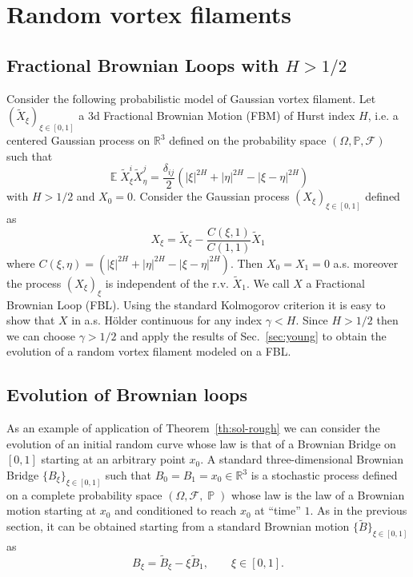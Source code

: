 \documentclass[a4paper,12pt,reqno]{amsart}
\DeclareMathOperator{\expect}{{\mathbb E}}
\DeclareMathOperator{\prob}{{\mathbb P}}
\begin{document}

\section{Random vortex filaments}
\label{sec:random}

\subsection{Fractional Brownian Loops with $H > 1/2$}
\label{sec:fbl}

Consider the following probabilistic model of Gaussian vortex
filament. Let $(\tilde X_\xi)_{\xi \in [0,1]}$ a 3d Fractional
Brownian Motion (FBM) of Hurst index $H$, i.e. a centered Gaussian process on
$\mathbb{R}^3$ defined on the probability space
$(\Omega,\mathbb{P},\mathcal{F})$ such that 
$$
 \expect \tilde X^i_\xi \tilde X^j_\eta 
= \frac{\delta_{ij}}{2}  (|\xi|^{2H}+|\eta|^{2H}-|\xi-\eta|^{2H})
$$
with $H > 1/2$ and $X_0 = 0$. Consider the Gaussian process $(X_\xi)_{\xi\in[0,1]}$
defined as 
$$
X_\xi = \tilde X_\xi - \frac{C(\xi,1)}{C(1,1)} \tilde X_1
$$
where $C(\xi,\eta) = (|\xi|^{2H}+|\eta|^{2H}-|\xi-\eta|^{2H})$.
Then $X_0 = X_1 = 0$ a.s. moreover the process $(X_\xi)_\xi$ is independent of
the r.v. $\tilde X_1$. We call $X$ a Fractional Brownian Loop (FBL).
Using the standard Kolmogorov criterion it is easy to show that $X$ in
a.s. H\"older continuous for any index $\gamma < H$. Since $H > 1/2$
then we can choose $\gamma > 1/2$ and apply the results of
Sec.~\ref{sec:young} to obtain the evolution of a random vortex
filament modeled on a FBL.


\subsection{Evolution of Brownian loops}
\label{sec:brownian}
As an example of application of Theorem~\ref{th:sol-rough} we can consider
the evolution of an initial random curve whose law is that of a
Brownian Bridge on $[0,1]$ starting at an arbitrary point $x_0$. A standard
three-dimensional Brownian Bridge $\{B_\xi\}_{\xi \in[0,1]}$ such that $B_0 =
B_1 = x_0 \in \mathbb{R}^3$ is a stochastic process defined on a
complete probability space $(\Omega,\mathcal{F},\prob)$ whose law is the law of
a Brownian motion starting at $x_0$ and conditioned to reach $x_0$ at
``time'' $1$. As in the previous section, it can be obtained starting
from a standard Brownian motion $\{ \tilde B\}_{\xi \in [0,1]}$ as
$$
B_\xi = \tilde B_{\xi} - \xi \tilde B_1, \qquad \xi \in [0,1].
$$
\end{document}

